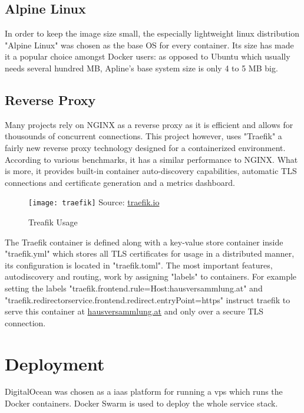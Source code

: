 \subsection{Alpine Linux}
In order to keep the image size small, the especially lightweight linux distribution "Alpine Linux" was chosen as the base OS for every container. Its size has made it a popular choice amongst Docker users: as opposed to Ubuntu which usually needs several hundred MB, Apline's base system size is only 4 to 5 MB big.

\subsection{Reverse Proxy}
Many projects rely on NGINX as a reverse proxy as it is efficient and allows for thousounds of concurrent connections. This project however, uses "Traefik" a fairly new reverse proxy technology designed for a containerized environment. According to various benchmarks, it has a similar performance to NGINX. What is more, it provides built-in container auto-discovery capabilities, automatic TLS connections and certificate generation and a metrics dashboard.

\begin{figure}[H]
    \begin{center}
    \texttt{[image: traefik]}
    Source: \href{https://traefik.io/}{traefik.io}
    \end{center}
    \caption{Treafik Usage}
    \label{fig:traefik}
\end{figure}

The Traefik container is defined along with a key-value store container inside "traefik.yml" which stores all TLS certificates for usage in a distributed manner, its configuration is located in "traefik.toml". The most important features, autodiscovery and routing, work by assigning "labels" to containers. For example setting the labels "traefik.frontend.rule=Host:hausversammlung.at" and "traefik.redirectorservice.frontend.redirect.entryPoint=https" instruct traefik to serve this container at \url{hausversammlung.at} and only over a secure TLS connection.

\section{Deployment}
DigitalOcean was chosen as a \acrfull{iaas} platform for running a \acrfull{vps} which runs the Docker containers. Docker Swarm is used to deploy the whole service stack.
